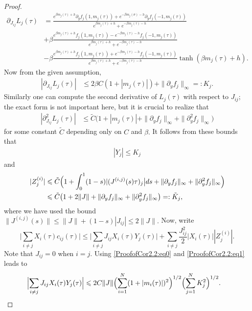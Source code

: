 \documentclass[10pt,a4paper]{amsart}
\let\gt=\tau \let\gth=\vartheta
\renewcommand{\le}{\leqslant}
\renewcommand{\leq}{\leqslant}
\newcommand{\mvgs}{{\sigma}}
\newcommand{\mvgt}{{\tau}}
\begin{document}
\begin{proof}
\begin{align*}
    \partial_{J_{ij}}L_j(\mvgt)&=\frac{e^{\beta m_j(\mvgt)+h}\partial_yf_j(1,m_j(\mvgt))+e^{-\beta m_j(\mvgs)-h}\partial_yf_j(-1,m_j(\mvgt))}{e^{\beta m_j(\mvgt)+h}+e^{-\beta m_j(\mvgt)-h}}\\
    &+\beta\frac{e^{\beta m_j(\mvgt)+h}f_j(1,m_j(\mvgt))-e^{-\beta m_j(\mvgt)-h}f_j(-1,m_j(\mvgt))}{e^{\beta m_j(\mvgt)+h}+e^{-\beta m_j(\mvgt)-h}}\\
    &-\beta\frac{e^{\beta m_j(\mvgt)+h}f_j(1,m_j(\mvgt))+e^{-\beta m_j(\mvgt)-h}f_j(-1,m_j(\mvgt))}{e^{\beta m_j(\mvgt)+h}+e^{-\beta m_j(\mvgt)-h}}\tanh(\beta m_j(\mvgt)+h).
\end{align*}
Now from the given assumption,
\begin{align*}
  |\partial_{J_{ij}}L_j(\mvgt)|&\leq 2\beta C(1+|m_j(\tau)|)+\|\partial_yf_j\|_\infty=:K_j.
\end{align*}
Similarly one can compute the second derivative of $L_j(\mvgt)$ with respect to $J_{ij}$; the exact form is not important here, but it is crucial to realize that
\begin{align*}
    |\partial_{J_{ij}}^2L_j(\mvgt)|&\leq \tilde C\bigl(1+|m_j(\tau)|+\|\partial_yf_j\|_\infty+\|\partial_y^2f_j\|_\infty\bigr)
\end{align*}
for some constant $\tilde C$ depending only on $C$ and $\beta.$ It follows from these bounds that 
\begin{align}\label{ProofofCor2.2:eq1}
    |Y_j|\leq K_j
\end{align} and
\begin{align}
 \nonumber   |Z_j^{(i)}|&\leq \tilde{C}\Bigl(1+\int_0^1(1-s)|(J^{(i,j)}(s)\tau)_j\bigr|ds+\|\partial_yf_j\|_\infty+\|\partial_y^2f_j\|_\infty\Bigr)\\
\label{ProofofCor2.2:eq2}    &\leq \tilde{C}\bigl(1+2\|J\|+\|\partial_yf_j\|_\infty+\|\partial_y^2f_j\|_\infty\bigr)=:\tilde{K}_j,
\end{align}
where we have used the bound $\|J^{(i,j)}(s)\|\leq \|J\|+(1-s)|J_{ij}|\leq 2\|J\|.$
Now, write
\[ \Big| \sum_{i \ne j} X_i(\tau) c_{ij}(\tau) \Big |\le \Big| \sum_{i \ne j} J_{ij} X_i(\tau) Y_j(\tau) \Big| + \sum_{i \ne j} \frac{J_{ij}^2}{2}|X_i(\tau)| |Z_j^{(i)}| .
\]
Note that $J_{ij}=0$ when $i=j$. Using \eqref{ProofofCor2.2:eq0} and \eqref{ProofofCor2.2:eq1} leads to
\begin{align*}
\Bigl|  \sum_{i\neq j} J_{ij} X_i(\gt) Y_j(\tau)  \Bigr|&\leq 2C\|J\|\Bigl(\sum_{i=1}^N(1+|m_i(\tau)|)^2\Bigr)^{1/2}\Bigl(\sum_{j=1}^NK_j^2\Bigr)^{1/2}.
\end{align*}

\end{proof}
\end{document}

